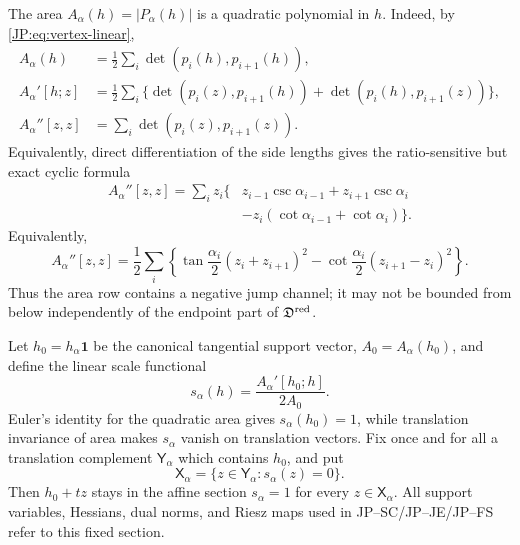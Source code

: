 The area $A_\alpha(h)=|P_\alpha(h)|$ is a quadratic polynomial in $h$.
Indeed, by \eqref{JP:eq:vertex-linear},
\begin{equation}\label{JP:eq:area-jets}
\begin{aligned}
 A_\alpha(h)&=\frac12\sum_i\det(p_i(h),p_{i+1}(h)),\\
 A_\alpha'[h;z]
 &=\frac12\sum_i\{\det(p_i(z),p_{i+1}(h))
                 +\det(p_i(h),p_{i+1}(z))\},\\
 A_\alpha''[z,z]&=\sum_i\det(p_i(z),p_{i+1}(z)).
\end{aligned}
\end{equation}
Equivalently, direct differentiation of the side lengths gives the
ratio-sensitive but exact cyclic formula
\begin{equation}\label{JP:eq:area-second-explicit}
\begin{aligned}
 A_\alpha''[z,z]
 =\sum_i z_i\{&z_{i-1}\csc\alpha_{i-1}
               +z_{i+1}\csc\alpha_i\\
              &-z_i(\cot\alpha_{i-1}+\cot\alpha_i)\}.
\end{aligned}
\end{equation}
Equivalently,
\begin{equation}\label{JP:eq:area-jump}
 A_\alpha''[z,z]=\frac12\sum_i\left\{
 \tan\frac{\alpha_i}{2}(z_i+z_{i+1})^2
 -\cot\frac{\alpha_i}{2}(z_{i+1}-z_i)^2\right\}.
\end{equation}
Thus the area row contains a negative jump channel; it may not be bounded
from below independently of the endpoint part of $\mathfrak D^{\rm red}$.

Let $h_0=h_\alpha\mathbf1$ be the canonical tangential support vector,
$A_0=A_\alpha(h_0)$, and define the linear scale functional
\begin{equation}\label{JP:eq:scale-section}
 s_\alpha(h)=\frac{A_\alpha'[h_0;h]}{2A_0}.
\end{equation}
Euler's identity for the quadratic area gives $s_\alpha(h_0)=1$, while
translation invariance of area makes $s_\alpha$ vanish on translation
vectors.  Fix once and for all a translation complement
$\mathsf Y_\alpha$ which contains $h_0$, and put
\begin{equation}\label{JP:eq:Xalpha}
 \mathsf X_\alpha=\{z\in\mathsf Y_\alpha:s_\alpha(z)=0\}.
\end{equation}
Then $h_0+tz$ stays in the affine section $s_\alpha=1$ for every
$z\in\mathsf X_\alpha$.  All support variables, Hessians, dual norms, and
Riesz maps used in JP--SC/JP--JE/JP--FS refer to this fixed section.

